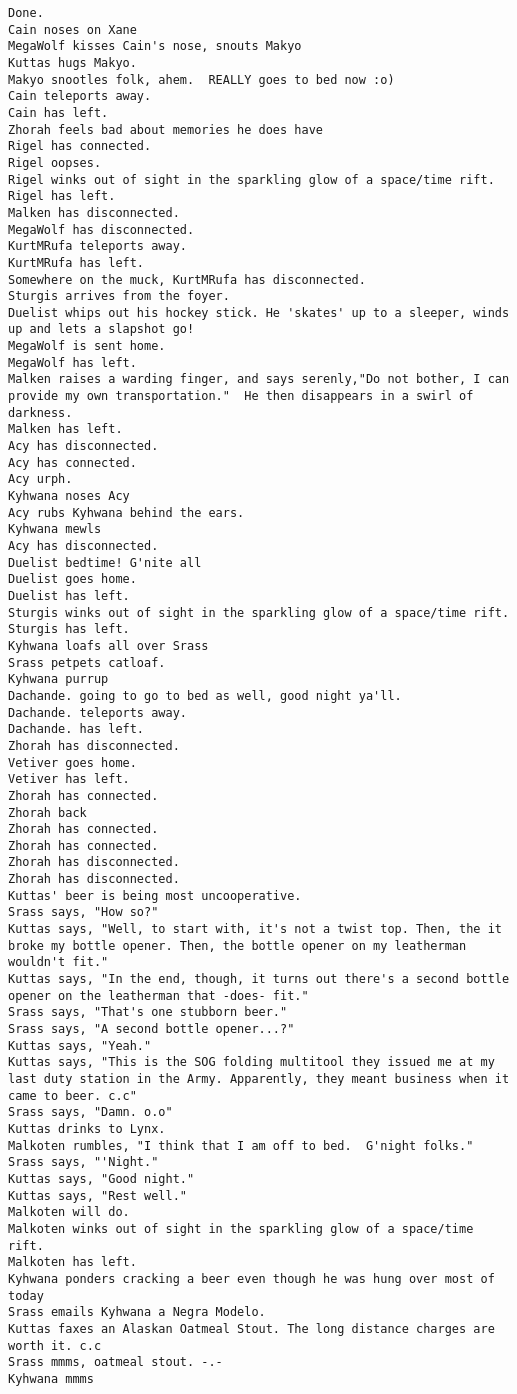 \begin{verbatim}
Done.
Cain noses on Xane
MegaWolf kisses Cain's nose, snouts Makyo
Kuttas hugs Makyo.
Makyo snootles folk, ahem.  REALLY goes to bed now :o)
Cain teleports away.
Cain has left.
Zhorah feels bad about memories he does have
Rigel has connected.
Rigel oopses.
Rigel winks out of sight in the sparkling glow of a space/time rift.
Rigel has left.
Malken has disconnected.
MegaWolf has disconnected.
KurtMRufa teleports away.
KurtMRufa has left.
Somewhere on the muck, KurtMRufa has disconnected.
Sturgis arrives from the foyer.
Duelist whips out his hockey stick. He 'skates' up to a sleeper, winds up and lets a slapshot go!
MegaWolf is sent home.
MegaWolf has left.
Malken raises a warding finger, and says serenly,"Do not bother, I can provide my own transportation."  He then disappears in a swirl of darkness.
Malken has left.
Acy has disconnected.
Acy has connected.
Acy urph.
Kyhwana noses Acy
Acy rubs Kyhwana behind the ears.
Kyhwana mewls
Acy has disconnected.
Duelist bedtime! G'nite all
Duelist goes home.
Duelist has left.
Sturgis winks out of sight in the sparkling glow of a space/time rift.
Sturgis has left.
Kyhwana loafs all over Srass
Srass petpets catloaf.
Kyhwana purrup
Dachande. going to go to bed as well, good night ya'll.
Dachande. teleports away.
Dachande. has left.
Zhorah has disconnected.
Vetiver goes home.
Vetiver has left.
Zhorah has connected.
Zhorah back
Zhorah has connected.
Zhorah has connected.
Zhorah has disconnected.
Zhorah has disconnected.
Kuttas' beer is being most uncooperative.
Srass says, "How so?"
Kuttas says, "Well, to start with, it's not a twist top. Then, the it broke my bottle opener. Then, the bottle opener on my leatherman wouldn't fit."
Kuttas says, "In the end, though, it turns out there's a second bottle opener on the leatherman that -does- fit."
Srass says, "That's one stubborn beer."
Srass says, "A second bottle opener...?"
Kuttas says, "Yeah."
Kuttas says, "This is the SOG folding multitool they issued me at my last duty station in the Army. Apparently, they meant business when it came to beer. c.c"
Srass says, "Damn. o.o"
Kuttas drinks to Lynx.
Malkoten rumbles, "I think that I am off to bed.  G'night folks."
Srass says, "'Night."
Kuttas says, "Good night."
Kuttas says, "Rest well."
Malkoten will do.
Malkoten winks out of sight in the sparkling glow of a space/time rift.
Malkoten has left.
Kyhwana ponders cracking a beer even though he was hung over most of today
Srass emails Kyhwana a Negra Modelo.
Kuttas faxes an Alaskan Oatmeal Stout. The long distance charges are worth it. c.c
Srass mmms, oatmeal stout. -.-
Kyhwana mmms

\end{verbatim}
